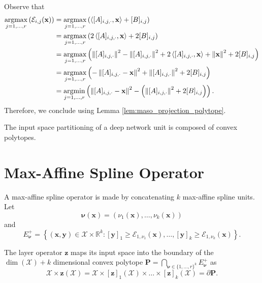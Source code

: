 \begin{tproof}
    Observe that
    \begin{align*}
        \operatorname*{\mathrm{argmax}}_{j=1,\dots,r}\left(\mathcal{E}_{i,j}(\mathbf{x})\right)&=\operatorname*{\mathrm{argmax}}_{j=1,\dots,r}\left(\left\langle[A]_{i,j,\cdot},\mathbf{x}\right\rangle+[B]_{i,j}\right)\\&=\operatorname*{\mathrm{argmax}}_{j=1,\dots,r}\left(2\left\langle[A]_{i,j,\cdot},\mathbf{x}\right\rangle+2[B]_{i,j}\right)\\&=\operatorname*{\mathrm{argmax}}_{j=1,\dots,r}\left(\left\Vert[A]_{i,j,\cdot}\right\Vert^2-\left\Vert[A]_{i,j,\cdot}\right\Vert^2+2\left\langle[A]_{i,j,\cdot},\mathbf{x}\right\rangle+\left\Vert\mathbf{x}\right\Vert^2+2[B]_{i,j}\right)\\&=\operatorname*{\mathrm{argmax}}_{j=1,\dots,r}\left(-\left\Vert[A]_{i,j,\cdot}-\mathbf{x}\right\Vert^2+\left\Vert[A]_{i,j,\cdot}\right\Vert^2+2[B]_{i,j}\right)\\&=\operatorname*{\mathrm{argmin}}_{j=1,\dots,r}\left(\left\Vert[A]_{i,j,\cdot}-\mathbf{x}\right\Vert^2-\left(\left\Vert[A]_{i,j,\cdot}\right\Vert^2+2[B]_{i,j}\right)\right).
    \end{align*}
    Therefore, we conclude using Lemma \ref{lem:maso_projection_polytope}.
\end{tproof}

\begin{corollary}
    The input space partitioning of a deep network unit is composed of convex polytopes.
\end{corollary}

\section{Max-Affine Spline Operator}

A max-affine spline operator is made by concatenating $k$ max-affine spline units. Let $$\boldsymbol{\nu}(\mathbf{x})=\left(\nu_1(\mathbf{x}),\dots,\nu_k(\mathbf{x})\right)$$and$$E^+_{\boldsymbol{\nu}}=\left\{(\mathbf{x},\mathbf{y})\in\mathcal{X}\times\mathbb{R}^k:[\mathbf{y}]_1\geq\mathcal{E}_{1,\nu_1}(\mathbf{x}),\dots,[\mathbf{y}]_k\geq\mathcal{E}_{1,\nu_k}(\mathbf{x})\right\}.$$

\begin{proposition}\label{prop:image_maso_input_space}
    The layer operator $\mathbf{z}$ maps its input space into the boundary of the $\dim(\mathcal{X})+k$ dimensional convex polytope $\mathbf{P}=\bigcap_{\boldsymbol{\nu}\in\{1,\dots,r\}^k}E_{\boldsymbol{\nu}}^+$ as $$\mathcal{X}\times\mathbf{z}(\mathcal{X})=\mathcal{X}\times [\mathbf{z}]_1(\mathcal{X})\times\dots\times[\mathbf{z}]_k(\mathcal{X})=\partial\mathbf{P}.$$
\end{proposition}

